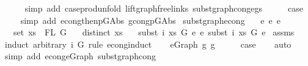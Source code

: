 \begin{isabellebody}
\ \ \ \ \isamarkupfalse%
\ {\isacharparenleft}{\kern0pt}simp\ add{\isacharcolon}{\kern0pt}\ case{\isacharunderscore}{\kern0pt}prod{\isacharunderscore}{\kern0pt}unfold\ lift{\isacharunderscore}{\kern0pt}graph{\isacharunderscore}{\kern0pt}freelinks\ subst{\isacharunderscore}{\kern0pt}graph{\isacharunderscore}{\kern0pt}cong{\isacharunderscore}{\kern0pt}egs{\isacharparenright}{\kern0pt}\isanewline
\ \ \isamarkupfalse%
\ \isamarkupfalse%
\ {\isacharquery}{\kern0pt}case\isanewline
\ \ \ \isamarkupfalse%
\ {\isacharparenleft}{\kern0pt}simp\ add{\isacharcolon}{\kern0pt}\ econg{\isacharunderscore}{\kern0pt}then{\isacharunderscore}{\kern0pt}p{\isacharunderscore}{\kern0pt}GAbs\ gcong{\isachardot}{\kern0pt}p{\isacharunderscore}{\kern0pt}GAbs{\isacharparenright}{\kern0pt}\isanewline
{}\isamarkupfalse%
%
\endisatagproof
{\isafoldproof}%
%
\isadelimproof
\isanewline
%
\endisadelimproof
\isanewline
\isanewline
\isanewline
{}\isamarkupfalse%
\ subst{\isacharunderscore}{\kern0pt}graph{\isacharunderscore}{\kern0pt}econg{}{\isacharcolon}{\kern0pt}\isanewline
\ \ \ {\isachardoublequoteopen}e{}\ {\isasymsimeq}e\ e{}{\isachardoublequoteclose}\isanewline
\ \ \ {\isachardoublequoteopen}set\ xs\ {\isacharequal}{\kern0pt}\ FL\ G{\isachardoublequoteclose}\isanewline
\ \ \ {\isachardoublequoteopen}distinct\ xs{\isachardoublequoteclose}\isanewline
\ \ \ {\isachardoublequoteopen}subst\ i\ xs\ G\ e{}\ {\isasymsimeq}e\ subst\ i\ xs\ G\ e{}{\isachardoublequoteclose}\isanewline
%
\isadelimproof
%
\endisadelimproof
%
\isatagproof
{}\isamarkupfalse%
\ assms\isanewline
{}\isamarkupfalse%
\ {\isacharparenleft}{\kern0pt}induct\ arbitrary{\isacharcolon}{\kern0pt}\ i\ G\ rule{\isacharcolon}{\kern0pt}\ econg{\isachardot}{\kern0pt}induct{\isacharparenright}{\kern0pt}\isanewline
\ \ \isamarkupfalse%
\ {\isacharparenleft}{\kern0pt}e{\isacharunderscore}{\kern0pt}Graph\ g\ g{\isacharprime}{\kern0pt}{\isacharparenright}{\kern0pt}\isanewline
\ \ \isamarkupfalse%
\ \isamarkupfalse%
\ {\isacharquery}{\kern0pt}case\isanewline
\ \ \isamarkupfalse%
\ auto\isanewline
\ \ \isamarkupfalse%
\ {\isacharparenleft}{\kern0pt}simp\ add{\isacharcolon}{\kern0pt}\ econg{\isachardot}{\kern0pt}e{\isacharunderscore}{\kern0pt}Graph\ subst{\isacharunderscore}{\kern0pt}graph{\isacharunderscore}{\kern0pt}cong{\isacharparenright}{\kern0pt}\isanewline

\end{isabellebody}
